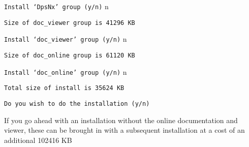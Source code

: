\documentclass[11pt]{article}
\begin{document}
{\tt Install `DpsNx' group (y/n)} n

{\tt Size of doc\_viewer group is 41296 KB}

{\tt Install `doc\_viewer' group (y/n)} n

{\tt Size of doc\_online group is 61120 KB}

{\tt Install `doc\_online' group (y/n)} n


{\tt Total size of install is 35624 KB}


{\tt Do you wish to do the installation (y/n)}


If you go ahead with an installation without the online documentation and
viewer, these can be brought in with a subsequent installation at a cost of an
additional 102416 KB
\end{document}
